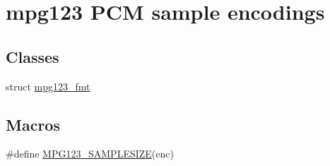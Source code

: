 \hypertarget{group__mpg123__enc}{}\section{mpg123 P\+CM sample encodings}
\label{group__mpg123__enc}
\subsection*{Classes}
\begin{DoxyCompactItemize}
\item 
struct \mbox{\hyperlink{structmpg123__fmt}{mpg123\+\_\+fmt}}
\end{DoxyCompactItemize}
\subsection*{Macros}
\begin{DoxyCompactItemize}
\item 
\#define \mbox{\hyperlink{group__mpg123__enc_gafa4071cca43ad223f5f2aea092b1b045}{M\+P\+G123\+\_\+\+S\+A\+M\+P\+L\+E\+S\+I\+ZE}}(enc)
\end{DoxyCompactItemize}
